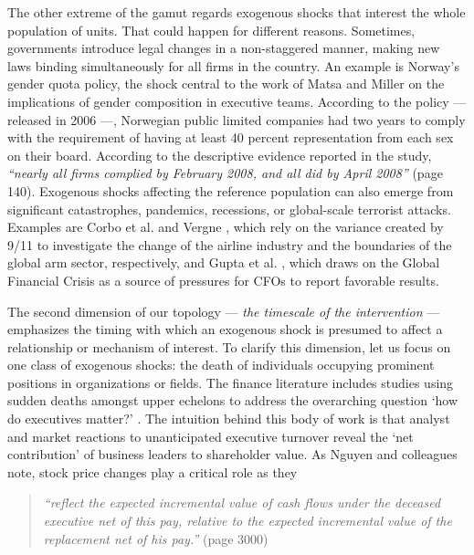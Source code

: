 \documentclass[11pt]{article}
\begin{document}
\begin{refsection}
The other extreme of the gamut regards exogenous shocks that interest the whole population of units. That could happen for different reasons. Sometimes, governments introduce legal changes in a non-staggered manner, making new laws binding simultaneously for all firms in the country.  An example is Norway's gender quota policy, the shock central to the work of Matsa and Miller \autocite*{matsa_miller_2013} on the implications of gender composition in executive teams. According to the policy --- released in 2006 ---, Norwegian public limited companies had two years to comply with the requirement of having at least 40 percent representation from each sex on their board. According to the descriptive evidence reported in the study, \textit{``nearly all firms complied by February 2008, and all did by April 2008''} (page 140). Exogenous shocks affecting the reference population can also emerge from significant catastrophes, pandemics, recessions, or global-scale terrorist attacks. Examples are Corbo et al. \autocite*{corbo2016323} and Vergne \autocite*{vergne20121027}, which rely on the variance created by 9/11 to investigate the change of the airline industry and the boundaries of the global arm sector, respectively, and Gupta et al. \autocite*{gupta2020802}, which draws on the Global  Financial Crisis as a source of pressures for CFOs to report favorable results.

The second dimension of our topology --- \textit{the timescale of the intervention} --- emphasizes the timing with which an exogenous shock is presumed to affect a relationship or mechanism of interest. To clarify this dimension, let us focus on one class of exogenous shocks: the death of individuals occupying prominent positions in organizations or fields. The finance literature includes studies using sudden deaths amongst upper echelons to address the overarching question `how do executives matter?' \autocites[e.g.,][]{johnson_et_al_1985,nguyen_et_al_2014,nguyen_et_al_2010, faccio_parsley_2009,salas_2010,fracassi_tate_2012,fee_et_al_2013,cho_et_al_2016, dedman_et_al_2002,duchin_sosyura_2013,falato_et_al_2014}. The intuition behind this body of work is that analyst and market reactions to unanticipated executive turnover reveal the `net contribution' of business leaders to shareholder value. As Nguyen  and colleagues \autocite*[][]{nguyen_et_al_2014} note, stock price changes  play a critical role as they

\begin{quote}
  \textit{
    ``reflect the expected incremental value of cash flows under the deceased
    executive net of this pay, relative to the expected incremental value of the
    replacement net of his pay.''
  }
  (page 3000)
\end{quote}


\end{refsection}
\end{document}
